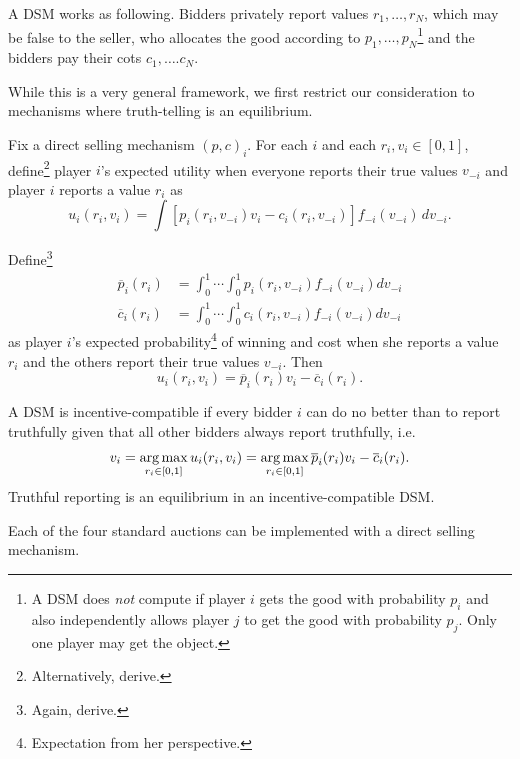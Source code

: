 A DSM works as following. Bidders privately report values $r_1,\ldots,r_N$, which may be false to the seller, who allocates the good according to $p_1, \ldots,p_N$\footnote{A DSM does \emph{not} compute if player $i$ gets the good with probability $p_i$ and also independently allows player $j$ to get the good with probability $p_j$. Only one player may get the object.} and the bidders pay their cots $c_1,\ldots.c_N$. 

While this is a very general framework, we first restrict our consideration to mechanisms where truth-telling is an equilibrium.

\begin{definition}
	Fix a direct selling mechanism $(p,c)_i$. For each $i$ and each $r_i, v_i \in [0,1]$, define\footnote{Alternatively, derive.} player $i$'s expected utility when everyone reports their true values $v_{-i}$ and player $i$ reports a value $r_i$ as
	\[
		u_i(r_i,v_i)
		= \int \left[ p_i(r_i,v_{-i})v_i - c_i(r_i, v_{-i}) \right] f_{-i}(v_{-i})\, dv_{-i}
	.\]

	Define\footnote{Again, derive.} \begin{align*}
		\overline{p}_i (r_i) &= \int_{0}^{1} \cdots \int_{0}^{1} p_i(r_i, v_{-i}) f_{-i}(v_{-i}) dv_{-i} \\
			\overline{c}_i(r_i) &= \int_{0}^{1}  \cdots \int_{0}^{1} c_i (r_i, v_{-i}) f_{-i}(v_{-i}) dv_{-i}
		\end{align*} as player $i$'s expected probability\footnote{Expectation from her perspective.} of winning and cost when she reports a value $r_i$ and the others report their true values $v_{-i}$.
	Then \[
		u_i(r_i,v_i) = \overline{p}_i(r_i)v_i - \overline{c}_i (r_i)
	.\] 

	A DSM is incentive-compatible if every bidder $i$ can do no better than to report truthfully given that all other bidders always report truthfully, i.e. \[
		v_i = \operatorname*{arg\,max}_{r_i \in [0,1]} u_i(r_i,v_i) = \operatorname*{arg\,max}_{r_i \in [0,1]} \overline{p}_i(r_i)v_i - \overline{c}_i (r_i)
	.\]  Truthful reporting is an equilibrium in an incentive-compatible DSM.
\end{definition}

\begin{proposition}	Each of the four standard auctions can be implemented with a direct selling mechanism.
\end{proposition}

